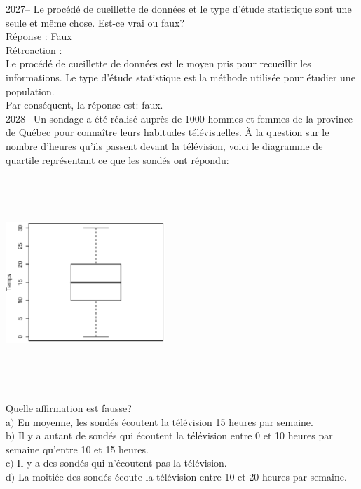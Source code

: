 \documentclass[letterpaper, 12pt]{article}
\begin{document}
2027-- Le proc\'ed\'e de cueillette de donn\'ees et le type d'\'etude statistique sont une seule et m\^eme chose. Est-ce vrai ou faux?\\

R\'eponse : Faux\\

R\'etroaction :\\
Le proc\'ed\'e de cueillette de donn\'ees est le moyen pris pour recueillir les informations. Le type d'\'etude statistique est la m\'ethode utilis\'ee pour \'etudier une population.\\
Par cons\'equent, la r\'eponse est: faux.\\


2028-- Un sondage a \'et\'e r\'ealis\'e aupr\`es de 1000 hommes et femmes de la province de Qu\'ebec pour conna\^itre leurs habitudes t\'el\'evisuelles. \`A la question sur le nombre d'heures qu'ils passent devant la t\'el\'evision, voici le diagramme de quartile repr\'esentant ce que les sond\'es ont r\'epondu:
\begin{center}
 \includegraphics[width=6cm,height=8cm,angle=-90]{Q2028.eps}
\end{center}

Quelle affirmation est fausse?\\

a$)$ En moyenne, les sond\'es \'ecoutent la t\'el\'evision 15 heures par semaine.\\
b$)$ Il y a autant de sond\'es qui \'ecoutent la t\'el\'evision entre 0 et 10 heures par semaine qu'entre 10 et 15 heures.\\
c$)$ Il y a des sond\'es qui n'\'ecoutent pas la t\'el\'evision.\\
d$)$ La moiti\'ee des sond\'es \'ecoute la t\'el\'evision entre 10 et 20 heures par semaine.\\
\end{document}

